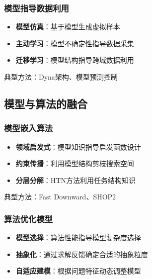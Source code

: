 \documentclass[12pt,a4paper]{ctexart}
\begin{document}
\subsubsection{模型指导数据利用}

\begin{fusionbox}
\begin{itemize}
    \item \textbf{模型仿真}：基于模型生成虚拟样本
    \item \textbf{主动学习}：模型不确定性指导数据采集
    \item \textbf{迁移学习}：模型结构指导跨域数据利用
\end{itemize}
典型方法：Dyna架构、模型预测控制
\end{fusionbox}

\subsection{模型与算法的融合}

\subsubsection{模型嵌入算法}

\begin{fusionbox}
\begin{itemize}
    \item \textbf{领域启发式}：模型知识指导启发函数设计
    \item \textbf{约束传播}：利用模型结构剪枝搜索空间
    \item \textbf{分层分解}：HTN方法利用任务结构知识
\end{itemize}
典型方法：Fast Downward、SHOP2
\end{fusionbox}

\subsubsection{算法优化模型}

\begin{fusionbox}
\begin{itemize}
    \item \textbf{模型选择}：算法性能指导模型复杂度选择
    \item \textbf{抽象化}：通过求解反馈确定合适的抽象粒度
    \item \textbf{自适应建模}：根据问题特征动态调整模型
\end{itemize}
\end{fusionbox}
\end{document}
